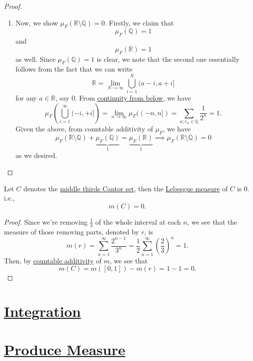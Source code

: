 \begin{proof}
\begin{enumerate}
		\item Now, we show \(\mu _{F}(\mathbb{R} \setminus \mathbb{Q} ) = 0\). Firstly, we claim that
		      \[
			      \mu _{F}(\mathbb{Q} ) = 1
		      \]
		      and
		      \[
			      \mu _{F}(\mathbb{R} ) = 1
		      \]
		      as well. Since \(\mu _{F}(\mathbb{Q} ) = 1\) is clear, we note that the second one essentially follows from the fact that we can write
		      \[
			      \mathbb{R} = \lim_{N \to \infty} \bigcup_{i=1}^{N} (a-i, a+i]
		      \]
		      for any \(a\in\mathbb{R} \), say \(0\). From \hyperref[thm:measure-space-continuity-from-below]{continuity from below}, we have
		      \[
			      \mu _{F}\left(\bigcup_{i=1}^{\infty} (-i, +i]\right) = \lim_{n \to \infty} \mu _{F}((-n, n]) = \sum_{n;r_{n}\in\mathbb{Q} }\frac{1}{2^n} = 1.
		      \]
		      Given the above, from countable additivity of \(\mu _{F}\), we have
		      \[
			      \mu _{F}(\mathbb{R} \setminus \mathbb{Q} ) + \underbrace{\mu _{F}(\mathbb{Q} )}_{1} = \underbrace{\mu _{F}(\mathbb{R} )}_{1} \implies \mu _{F}(\mathbb{R} \setminus \mathbb{Q} ) = 0
		      \]
		      as we desired.
	\end{enumerate}
\end{proof}

\begin{lemma}\label{lma:Cantor-set-has-measure-0}
	Let \(C\) denotes the \hyperref[eg:lec8:Cantor-set]{middle thirds Cantor set}, then the \hyperref[def:Lebesgue-measure]{Lebesgue measure} of \(C\) is \(0\). i.e.,
	\[
		m(C) = 0.
	\]
\end{lemma}
\begin{proof}
	Since we're removing \(\frac{1}{3}\) of the whole interval at each \(n\), we see that the measure of those removing parts, denoted by \(r\), is
	\[
		m(r) = \sum_{n=1}^{\infty} \frac{2^{n-1}}{3^n} = \frac{1}{2}\sum_{n=1}^{\infty} \left(\frac{2}{3}\right)^n = 1.
	\]
	Then, by \hyperref[def:measure]{countable additivity} of \(m\), we see that
	\[
		m(C) = m([0, 1]) - m(r) = 1 - 1 = 0.
	\]
\end{proof}

\section{\hyperref[ch:Integration]{Integration}}

\section{\hyperref[ch:Product-Measure]{Produce Measure}}

